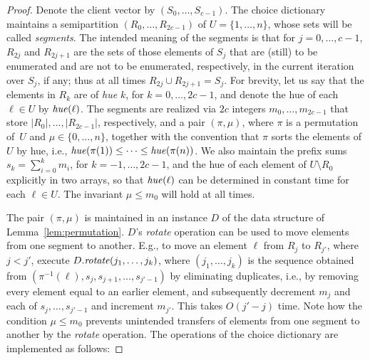 \documentclass[envcountsame,envcountsect,undated,nolinenumbers]{lnthi}
\def\Tvn#1{\hbox{\textit{#1\/}}}
\begin{document}
\begin{proof}
Denote the client vector by $(S_0,\ldots,S_{c-1})$.
The choice dictionary maintains a semipartition
$(R_0,\ldots,R_{2 c-1})$
of $U=\{1,\ldots,n\}$, whose sets
will be called \emph{segments}.
The intended meaning of the segments is that
for $j=0,\ldots,c-1$, $R_{2 j}$ and $R_{2 j+1}$
are the sets of those elements of $S_j$ that are (still)
to be enumerated and are not to be enumerated, respectively,
in the current iteration over $S_j$, if any;
thus at all times $R_{2 j}\cup R_{2 j+1}=S_j$.
For brevity, let us say that the elements in $R_k$
are of \emph{hue} $k$, for $k=0,\ldots,2 c-1$, and
denote the hue of each $\ell\in U$ by $\Tvn{hue}(\ell)$.
The segments are realized via $2 c$ integers
$m_0,\ldots,m_{2 c-1}$ that store $|R_0|,\ldots,|R_{2 c-1}|$,
respectively, and a pair $(\pi,\mu)$,
where $\pi$ is a permutation of~$U$ and
$\mu\in\{0,\ldots,n\}$,
together with
the convention that
$\pi$ sorts the elements of $U$ by hue, i.e.,
$\Tvn{hue}(\pi(1))\le\cdots\le\Tvn{hue}(\pi(n))$.
We also maintain the prefix sums
$s_k=\sum_{i=0}^k m_i$, for $k=-1,\ldots,2 c-1$,
and the hue of each element of $U\setminus R_0$
explicitly in two arrays, so that $\Tvn{hue}(\ell)$
can be determined in constant time for each $\ell\in U$.
The invariant $\mu\le m_0$ will hold at all times.

The pair $(\pi,\mu)$ is maintained in an instance
$D$ of the data structure of Lemma~\ref{lem:permutation}.
$D$'s \Tvn{rotate} operation can be used
to move elements from one segment to another.
E.g., to move an element $\ell$ from $R_j$ to
$R_{j'}$, where $j<j'$,
execute $D.\Tvn{rotate}(j_1,\ldots,j_k)$,
where $(j_1,\ldots,j_k)$ is the sequence obtained
from $(\pi^{-1}(\ell),s_j,s_{j+1},\ldots,s_{j'-1})$
by eliminating duplicates, i.e., by removing every
element equal to an earlier element,
and subsequently decrement $m_j$
and each of $s_j,\ldots,s_{j'-1}$ and increment $m_{j'}$.
This takes $O(j'-j)$ time.
Note how the condition $\mu\le m_0$ prevents
unintended transfers of elements from one segment to another
by the \Tvn{rotate} operation.
The operations of the choice dictionary
are implemented as follows:


\end{proof}
\end{document}
